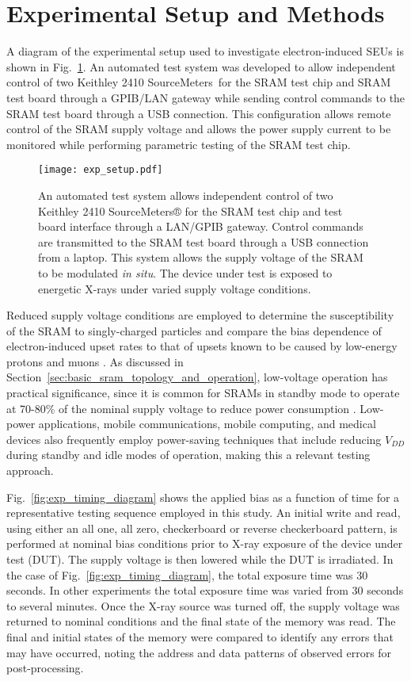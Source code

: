 \section{Experimental Setup and Methods} %
\label{sec:experimental_setup_and_methods}
A diagram of the experimental setup used to investigate electron-induced SEUs is shown in Fig.~\ref{fig:exp_diagram}. 
An automated test system was developed to allow independent control of two Keithley 2410 SourceMeters\textregistered~for the SRAM test chip and SRAM test board through a GPIB/LAN gateway while sending control commands to the SRAM test board through a USB connection. 
This configuration allows remote control of the SRAM supply voltage and allows the power supply current to be monitored while performing parametric testing of the SRAM test chip.
\begin{figure}[tb]
    \centering
        \texttt{[image: exp\_setup.pdf]}
        \caption{An automated test system allows independent control of two Keithley 2410 SourceMeters® for the SRAM test chip and test board interface through a LAN/GPIB gateway. Control commands are transmitted to the SRAM test board through a USB connection from a laptop. This system allows the supply voltage of the SRAM to be modulated \emph{in situ}. The device under test is exposed to energetic X-rays under varied supply voltage conditions.}
        \label{fig:exp_diagram}
\end{figure}

Reduced supply voltage conditions are employed to determine the susceptibility of the SRAM to singly-charged particles and compare the bias dependence of electron-induced upset rates to that of upsets known to be caused by low-energy protons and muons \cite{Rodbell:2007vl, Sierawski:2010cj}.
As discussed in Section~\ref{sec:basic_sram_topology_and_operation}, low-voltage operation has practical significance, since it is common for SRAMs in standby mode to operate at 70-80\% of the nominal supply voltage to reduce power consumption \cite{semeraro:2002dvfs,david:2011dvfs}.
Low-power applications, mobile communications, mobile computing, and medical devices also frequently employ power-saving techniques that include reducing $V_{DD}$ during standby and idle modes of operation, making this a relevant testing approach.

Fig.~\ref{fig:exp_timing_diagram} shows the applied bias as a function of time for a representative testing sequence employed in this study. 
An initial write and read, using either an all one, all zero, checkerboard or reverse checkerboard pattern, is performed at nominal bias conditions prior to X-ray exposure of the device under test (DUT). 
The supply voltage is then lowered while the DUT is irradiated. In the case of Fig.~\ref{fig:exp_timing_diagram}, the total exposure time was 30 seconds. 
In other experiments the total exposure time was varied from 30 seconds to several minutes. 
Once the X-ray source was turned off, the supply voltage was returned to nominal conditions and the final state of the memory was read. 
The final and initial states of the memory were compared to identify any errors that may have occurred, noting the address and data patterns of observed errors for post-processing.

